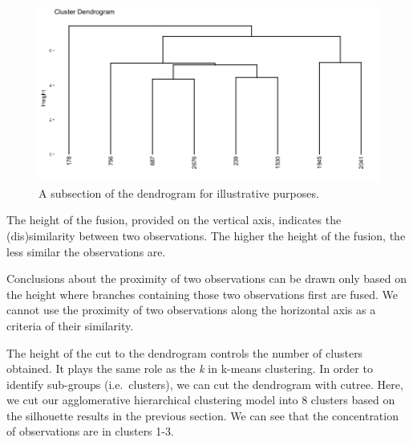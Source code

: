 \documentclass[]{book}
\newenvironment{Shaded}{\begin{snugshade}}{\end{snugshade}}
\newcommand{\DataTypeTok}[1]{\textcolor[rgb]{0.13,0.29,0.53}{#1}}
\newcommand{\DecValTok}[1]{\textcolor[rgb]{0.00,0.00,0.81}{#1}}
\newcommand{\KeywordTok}[1]{\textcolor[rgb]{0.13,0.29,0.53}{\textbf{#1}}}
\newcommand{\NormalTok}[1]{#1}
\newcommand{\OperatorTok}[1]{\textcolor[rgb]{0.81,0.36,0.00}{\textbf{#1}}}
\newcommand{\StringTok}[1]{\textcolor[rgb]{0.31,0.60,0.02}{#1}}
\theoremstyle{definition}
\theoremstyle{definition}
\theoremstyle{definition}
\theoremstyle{remark}
\let\BeginKnitrBlock\begin \let\EndKnitrBlock\end
\begin{document}
\begin{Shaded}
\end{Shaded}

\begin{figure}

{\centering \includegraphics[width=0.7\linewidth]{illustrations/illustrative_sub_dendrogram} 

}

\caption{A subsection of the dendrogram for illustrative purposes.}\label{fig:illustrative-dendrogram-plot}
\end{figure}

The height of the fusion, provided on the vertical axis, indicates the
(dis)similarity between two observations. The higher the height of the
fusion, the less similar the observations are.

\BeginKnitrBlock{warning}
Conclusions about the proximity of two observations can be drawn only
based on the height where branches containing those two observations
first are fused. We cannot use the proximity of two observations along
the horizontal axis as a criteria of their similarity.
\EndKnitrBlock{warning}

The height of the cut to the dendrogram controls the number of clusters
obtained. It plays the same role as the \emph{k} in k-means clustering.
In order to identify sub-groups (i.e.~clusters), we can cut the
dendrogram with cutree. Here, we cut our agglomerative hierarchical
clustering model into 8 clusters based on the silhouette results in the
previous section. We can see that the concentration of observations are
in clusters 1-3.
\end{document}
